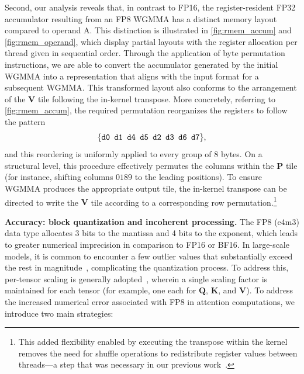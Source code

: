 Second, our analysis reveals that, in contrast to FP16, the register-resident FP32 accumulator resulting from an FP8 WGMMA has a distinct memory layout compared to operand A. This distinction is illustrated in \cref{fig:rmem_accum} and \cref{fig:rmem_operand}, which display partial layouts with the register allocation per thread given in sequential order. Through the application of byte permutation instructions, we are able to convert the accumulator generated by the initial WGMMA into a representation that aligns with the input format for a subsequent WGMMA. This transformed layout also conforms to the arrangement of the $\mathbf{V}$ tile following the in-kernel transpose. More concretely, referring to \cref{fig:rmem_accum}, the required permutation reorganizes the registers to follow the pattern
$$\{ \verb|d0 d1 d4 d5 d2 d3 d6 d7| \},$$
and this reordering is uniformly applied to every group of 8 bytes. On a structural level, this procedure effectively permutes the columns within the $\mathbf{P}$ tile (for instance, shifting columns $0189$ to the leading positions). To ensure WGMMA produces the appropriate output tile, the in-kernel transpose can be directed to write the $\mathbf{V}$ tile according to a corresponding row permutation.\footnote{This added flexibility enabled by executing the transpose within the kernel removes the need for shuffle operations to redistribute register values between threads—a step that was necessary in our previous work~\citep{colfax_fp8_flashattention_2024}.}

\textbf{Accuracy: block quantization and incoherent processing.} The FP8 (e4m3) data type allocates 3 bits to the mantissa and 4 bits to the exponent, which leads to greater numerical imprecision in comparison to FP16 or BF16. In large-scale models, it is common to encounter a few outlier values that substantially exceed the rest in magnitude~\citep{dettmers2208llm,
  sun2024massive}, complicating the quantization process. To address this, per-tensor scaling is generally adopted~\citep{micikevicius2022fp8}, wherein a single scaling factor is maintained for each tensor (for example, one each for $\mathbf{Q}$, $\mathbf{K}$, and $\mathbf{V}$).
To address the increased numerical error associated with FP8 in attention computations, we introduce two main strategies:

